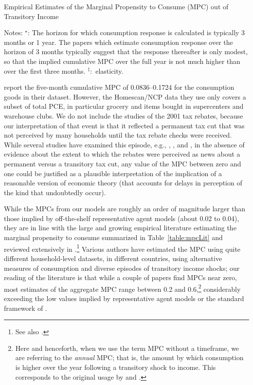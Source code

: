 \documentclass[12pt,titlepage]{econtex}
\newcommand{\tablenotessize}[1]{\footnotesize{#1}} %
\begin{document}
\begin{table}\small
\caption{Empirical Estimates of the Marginal Propensity to Consume (MPC) out of Transitory Income}
\label{table:mpcLit}
\begin{minipage}{\textwidth}

\tablenotessize{Notes: $^{\star}$: The horizon for which consumption response is calculated is typically 3 months or 1 year.
The papers which estimate consumption response over the horizon of 3 months typically suggest that the response
thereafter is only modest, so that the implied cumulative MPC over the full year is not much higher than over the first three months.
$^{\ddagger}$:~elasticity.

\citet{brodaParker:stimulus2008} report the five-month cumulative MPC of 0.0836--0.1724 for the consumption goods in their dataset. However, the Homescan/NCP data they use only covers a subset of total PCE, in particular grocery and items bought in supercenters and warehouse clubs.
We do not include the studies of the 2001 tax rebates, because our interpretation of that event is that it reflected a permanent tax cut that was not perceived by many households until the tax rebate checks were received.  While several studies have examined this episode, e.g., \citet{shapiroSlemrod:AER03}, \citet{jpsTax}, \citet{aslCredit} and \citet{misraSurico:heteroResponses}, in the absence of evidence about the extent to which the rebates were perceived as news about a permanent versus a transitory tax cut, any value of the MPC between zero and one could be justified as a plausible interpretation of the implication of a reasonable version of economic theory (that accounts for delays in perception of the kind that undoubtedly occur).}
\end{minipage}
\end{table}



While the MPCs from our models are roughly an order of
magnitude larger than those implied by off-the-shelf representative
agent models (about 0.02 to 0.04), they are in line with the large and
growing empirical literature estimating the marginal propensity to
consume summarized in Table~\ref{table:mpcLit} and reviewed
extensively in \citet{jpCResponse}.\footnote{See also \citet{pseIncDistributionAndC}.}
Various authors have
estimated the MPC using quite different household-level datasets, in
different countries, using alternative measures of consumption and
diverse episodes of transitory income shocks; our reading of the
literature is that while a couple of papers find MPCs near zero, most estimates of the aggregate MPC range between
0.2 and 0.6,\footnote{Here and henceforth, when we use the term MPC
  without a timeframe, we are referring to the {\it annual} MPC; that
  is, the amount by which consumption is higher over the year
  following a transitory shock to income.  This corresponds to the
  original usage by \cite{keynes:generaltheory} and
  \cite{friedmanATheory}.}  considerably exceeding the low values
implied by representative agent models or the standard framework of
\citet{ksHeteroPort,ksHetero}.
\end{document}
